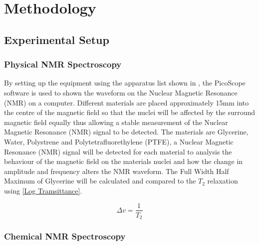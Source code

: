 \documentclass[12pt]{article}
\begin{document}
\section{Methodology}
\label{Methodology Section}

\subsection{Experimental Setup}
\label{Experimental Setup Subsection}

\subsubsection{Physical NMR Spectroscopy}
\label{Physical NMR Spectroscopy SubsubSection}

By setting up the equipment using the apparatus list shown in \cite{Exp.A-2020}, the PicoScope software is used to shown the waveform on the Nuclear Magnetic Resonance (NMR) on a computer. Different materials are placed approximately 15mm into the centre of the magnetic field so that the nuclei will be affected by the surround magnetic field equally thus allowing a stable measurement of the Nuclear Magnetic Resonance (NMR) signal to be detected. The materials are Glycerine, Water, Polystrene and Polytetrafluorethylene (PTFE), a Nuclear Magnetic Resonance (NMR) signal will be detected for each material to analysis the behaviour of the magnetic field on the materials nuclei and how the change in amplitude and frequency alters the NMR waveform. The Full Width Half Maximum of Glycerine will be calculated and compared to the $T_2$ relaxation using \cref{Log Tramsittance}.

\begin{equation}
\Delta v= \dfrac{1}{T_2}
\label{Log Tramsittance}
\end{equation}

\subsubsection{Chemical NMR Spectroscopy}
\label{Chemical NMR Spectroscopy SubsubSection}
\end{document}

